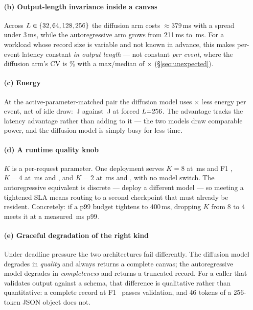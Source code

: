 \paragraph{(b) Output-length invariance inside a canvas}
Across $L \in \{32, 64, 128, 256\}$ the diffusion arm costs
$\approx$379\,ms with a spread under 3\,ms, while the autoregressive arm grows
from 211\,ms to \arAnchorTwoFive\,ms. For a workload whose record size is
variable and not known in advance, this makes per-event latency constant
\emph{in output length} --- not constant \emph{per event}, where the diffusion
arm's CV is \dgEventCV\% with a max/median of \dgMaxMed$\times$
(\S\ref{sec:unexpected}).

\paragraph{(c) Energy}
At the active-parameter-matched pair the diffusion model uses \energyRatio$\times$ less
energy per event, net of idle draw: \dgEnergy\,J against \arThreeEnergy\,J at
forced $L{=}256$. The advantage tracks the latency advantage rather
than adding to it --- the two models draw comparable power, and the diffusion
model is simply busy for less time.

\paragraph{(d) A runtime quality knob}
$K$ is a per-request parameter. One deployment serves $K{=}8$ at
\kEightPfifty\,ms and F1 \kEightFone, $K{=}4$ at \kFourPfifty\,ms and
\kFourFone, and $K{=}2$ at \kTwoPfifty\,ms and \kTwoFone, with no model
switch. The autoregressive equivalent is discrete --- deploy a different model
--- so meeting a tightened SLA means routing to a second checkpoint that must
already be resident. Concretely: if a p99 budget tightens to 400\,ms, dropping
$K$ from 8 to 4 meets it at a measured \kFourPninetynine\,ms p99.

\paragraph{(e) Graceful degradation of the right kind}
Under deadline pressure the two architectures fail differently. The diffusion
model degrades in \emph{quality} and always returns a complete canvas; the
autoregressive model degrades in \emph{completeness} and returns a truncated
record. For a caller that validates output against a schema, that difference
is qualitative rather than quantitative: a complete record at F1 \kFourFone\
passes validation, and 46 tokens of a 256-token JSON object does not.

